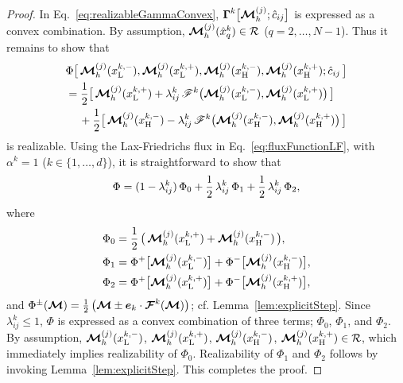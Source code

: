 \begin{proof}
  In Eq.~\eqref{eq:realizableGammaConvex}, $\boldsymbol{\Gamma}^{k}\big[\boldsymbol{\mathcal{M}}_{h}^{(j)};\hat{c}_{ij}\big]$ is expressed as a convex combination.  
  By assumption, $\boldsymbol{\mathcal{M}}_{h}^{(j)}(\hat{x}_{q}^{k})\in\mathcal{R}$ ($q=2,\ldots,N-1$).  
  Thus it remains to show that
  \begin{align*}
    &\Phi\big[\,\boldsymbol{\mathcal{M}}_{h}^{(j)}(x_{{\rm L}}^{k,-}),\boldsymbol{\mathcal{M}}_{h}^{(j)}(x_{{\rm L}}^{k,+}),\boldsymbol{\mathcal{M}}_{h}^{(j)}(x_{{\rm H}}^{k,-}),\boldsymbol{\mathcal{M}}_{h}^{(j)}(x_{{\rm H}}^{k,+});\hat{c}_{ij}\,\big] \\
    &=\frac{1}{2}\big[\,\boldsymbol{\mathcal{M}}_{h}^{(j)}(x_{{\rm L}}^{k,+})+\lambda_{ij}^{k}\,\mathscr{F}^{k}\big(\boldsymbol{\mathcal{M}}_{h}^{(j)}(x_{{\rm L}}^{k,-}),\boldsymbol{\mathcal{M}}_{h}^{(j)}(x_{{\rm L}}^{k,+})\big)\,\big] \\
    &\hspace{12pt}
    +\frac{1}{2}\big[\,\boldsymbol{\mathcal{M}}_{h}^{(j)}(x_{{\rm H}}^{k,-})-\lambda_{ij}^{k}\,\mathscr{F}^{k}\big(\boldsymbol{\mathcal{M}}_{h}^{(j)}(x_{{\rm H}}^{k,-}),\boldsymbol{\mathcal{M}}_{h}^{(j)}(x_{{\rm H}}^{k,+})\big)\,\big]
  \end{align*}
  is realizable.  
  Using the Lax-Friedrichs flux in Eq.~\eqref{eq:fluxFunctionLF}, with $\alpha^{k}=1$ ($k\in\{1,\ldots,d\}$), it is straightforward to show that
  \begin{equation}
    \Phi=(1-\lambda_{ij}^{k})\,\Phi_{0} + \frac{1}{2}\,\lambda_{ij}^{k}\,\Phi_{1} + \frac{1}{2}\,\lambda_{ij}^{k}\,\Phi_{2},
    \label{eq:phiConvex}
  \end{equation}
  where
  \begin{align*}
    \Phi_{0} &= \frac{1}{2}\,\big(\,\boldsymbol{\mathcal{M}}_{h}^{(j)}(x_{{\rm L}}^{k,+})+\boldsymbol{\mathcal{M}}_{h}^{(j)}(x_{{\rm H}}^{k,-})\,\big), \\
    \Phi_{1} &= \Phi^{+}\big[\boldsymbol{\mathcal{M}}_{h}^{(j)}(x_{{\rm L}}^{k,-})\big]+\Phi^{-}\big[\boldsymbol{\mathcal{M}}_{h}^{(j)}(x_{{\rm H}}^{k,-})\big], \\
    \Phi_{2} &= \Phi^{+}\big[\boldsymbol{\mathcal{M}}_{h}^{(j)}(x_{{\rm L}}^{k,+})\big]+\Phi^{-}\big[\boldsymbol{\mathcal{M}}_{h}^{(j)}(x_{{\rm H}}^{k,+})\big],
  \end{align*}
  and $\Phi^{\pm}(\boldsymbol{\mathcal{M}})=\frac{1}{2}\,\big(\boldsymbol{\mathcal{M}}\pm\boldsymbol{e}_{k}\cdot\boldsymbol{\mathcal{F}}^{k}(\boldsymbol{\mathcal{M}})\big)$; cf. Lemma~\ref{lem:explicitStep}.  
  Since $\lambda_{ij}^{k}\le1$, $\Phi$ is expressed as a convex combination of three terms; $\Phi_{0}$, $\Phi_{1}$, and $\Phi_{2}$.  
  By assumption, $\boldsymbol{\mathcal{M}}_{h}^{(j)}(x_{{\rm L}}^{k,-})$, $\boldsymbol{\mathcal{M}}_{h}^{(j)}(x_{{\rm L}}^{k,+})$, $\boldsymbol{\mathcal{M}}_{h}^{(j)}(x_{{\rm H}}^{k,-})$, $\boldsymbol{\mathcal{M}}_{h}^{(j)}(x_{{\rm H}}^{k,+})\in\mathcal{R}$, which immediately implies realizability of $\Phi_{0}$.  
  Realizability of $\Phi_{1}$ and $\Phi_{2}$ follows by invoking Lemma~\ref{lem:explicitStep}.  
  This completes the proof.  
\end{proof}

